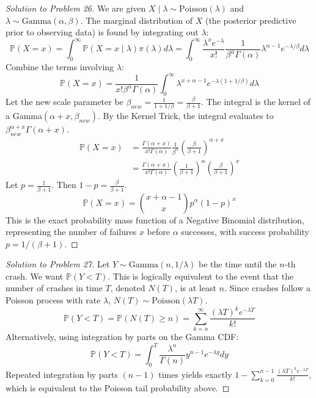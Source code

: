 \documentclass[11pt, a4paper]{article}
\theoremstyle{definition}
\theoremstyle{remark}
\newcommand{\Prob}{\mathbb{P}}
\begin{document}
\begin{proof}[Solution to Problem 26]
We are given $X \mid \lambda \sim \text{Poisson}(\lambda)$ and $\lambda \sim \text{Gamma}(\alpha, \beta)$.
The marginal distribution of $X$ (the posterior predictive prior to observing data) is found by integrating out $\lambda$:
\[ \Prob(X = x) = \int_0^\infty \Prob(X = x \mid \lambda) \pi(\lambda) d\lambda = \int_0^\infty \frac{\lambda^x e^{-\lambda}}{x!} \frac{1}{\beta^\alpha \Gamma(\alpha)} \lambda^{\alpha-1} e^{-\lambda/\beta} d\lambda \]
Combine the terms involving $\lambda$:
\[ \Prob(X = x) = \frac{1}{x! \beta^\alpha \Gamma(\alpha)} \int_0^\infty \lambda^{x+\alpha-1} e^{-\lambda(1 + 1/\beta)} d\lambda \]
Let the new scale parameter be $\beta_{new} = \frac{1}{1 + 1/\beta} = \frac{\beta}{\beta+1}$. The integral is the kernel of a Gamma$(\alpha+x, \beta_{new})$. By the Kernel Trick, the integral evaluates to $\beta_{new}^{\alpha+x} \Gamma(\alpha+x)$.
\begin{align*}
\Prob(X = x) &= \frac{\Gamma(\alpha+x)}{x! \Gamma(\alpha)} \frac{1}{\beta^\alpha} \left( \frac{\beta}{\beta+1} \right)^{\alpha+x} \\
&= \frac{\Gamma(\alpha+x)}{x! \Gamma(\alpha)} \left( \frac{1}{\beta+1} \right)^\alpha \left( \frac{\beta}{\beta+1} \right)^x
\end{align*}
Let $p = \frac{1}{\beta+1}$. Then $1-p = \frac{\beta}{\beta+1}$.
\[ \Prob(X = x) = \binom{x+\alpha-1}{x} p^\alpha (1-p)^x \]
This is the exact probability mass function of a Negative Binomial distribution, representing the number of failures $x$ before $\alpha$ successes, with success probability $p = 1/(\beta+1)$.
\end{proof}

\begin{proof}[Solution to Problem 27]
Let $Y \sim \text{Gamma}(n, 1/\lambda)$ be the time until the $n$-th crash. We want $\Prob(Y < T)$.
This is logically equivalent to the event that the number of crashes in time $T$, denoted $N(T)$, is at least $n$.
Since crashes follow a Poisson process with rate $\lambda$, $N(T) \sim \text{Poisson}(\lambda T)$.
\[ \Prob(Y < T) = \Prob(N(T) \ge n) = \sum_{k=n}^\infty \frac{(\lambda T)^k e^{-\lambda T}}{k!} \]
Alternatively, using integration by parts on the Gamma CDF:
\[ \Prob(Y < T) = \int_0^T \frac{\lambda^n}{\Gamma(n)} y^{n-1} e^{-\lambda y} dy \]
Repeated integration by parts $(n-1)$ times yields exactly $1 - \sum_{k=0}^{n-1} \frac{(\lambda T)^k e^{-\lambda T}}{k!}$, which is equivalent to the Poisson tail probability above.
\end{proof}
\end{document}
